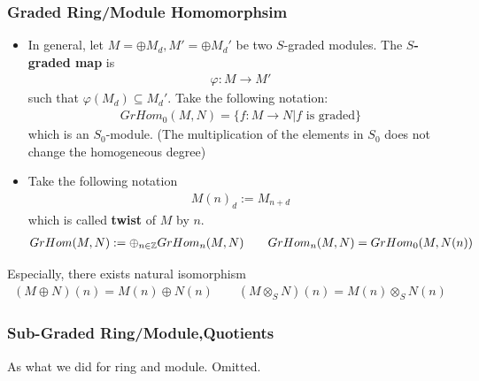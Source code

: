 \documentclass[Total.tex]{subfiles}
\begin{document}
			\subsubsection{Graded Ring/Module Homomorphsim}
			\begin{Def}
				\begin{itemize}
					\item In general, let $M=\oplus M_d,M'=\oplus M_d'$ be two $S$-graded modules. The \textbf{$S$-graded map} is 
					\begin{gather*}
						\varphi:M\rightarrow M'
					\end{gather*}
					such that $\varphi(M_d)\subseteq M_d'$. 
					Take the following notation:
					\begin{gather*}
						GrHom_0(M,N)=\{f:M\rightarrow N|f\mbox{ is graded}\}
					\end{gather*}
					which is an $S_0$-module. (The multiplication of the elements in $S_0$ does not change the homogeneous degree)
					\item Take the following notation
					\begin{gather*}
						M(n)_d:=M_{n+d}
					\end{gather*}
					which is called \textbf{twist} of $M$ by $n$.
					\begin{gather*}
						GrHom(M,N):=\oplus_{n\in \mathbb{Z}} GrHom_n(M,N)\qquad GrHom_n(M,N)=GrHom_0(M,N(n))
					\end{gather*}
				\end{itemize}
			\end{Def}
			Especially, there exists natural isomorphism
			\begin{gather*}
				(M\oplus N)(n)=M(n)\oplus N(n)\qquad (M\otimes_S N)(n)=M(n)\otimes_S N(n)
			\end{gather*}
			\subsubsection{Sub-Graded Ring/Module,Quotients}
			As what we did for ring and module. Omitted.
\end{document}
